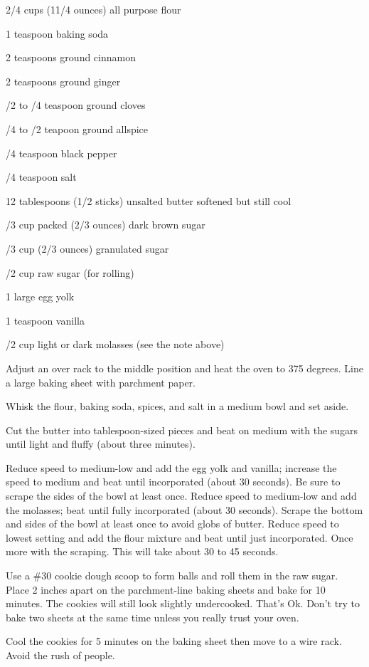 \begin{IngredientsAndSteps}
    \ListIngredientsAndSteps
    {
        2/4 cups (11/4 ounces) all purpose flour

        1 teaspoon baking soda

        2 teaspoons ground cinnamon

        2 teaspoons ground ginger

        /2 to /4 teaspoon ground cloves

        /4 to /2 teapoon ground allspice

        /4 teaspoon black pepper

        /4 teaspoon salt

        \IngredientsSeparatorClear

        12 tablespoons (1/2 sticks) unsalted butter softened but still cool

        /3 cup packed (2/3 ounces) dark brown sugar

        /3 cup (2/3 ounces) granulated sugar

        /2 cup raw sugar (for rolling)

        1 large egg yolk

        1 teaspoon vanilla

        /2 cup light or dark molasses (see the note above)

    }
    {
        Adjust an over rack to the middle position and heat the oven to 375 degrees. Line a large baking sheet
        with parchment paper.

        Whisk the flour, baking soda, spices, and salt in a medium bowl and set aside.

        Cut the butter into tablespoon-sized pieces and beat on medium with the sugars until light and fluffy
        (about three minutes).

        Reduce speed to medium-low and add the egg yolk and vanilla; increase the speed to medium and beat
        until incorporated (about 30 seconds). Be sure to scrape the sides of the bowl at least once. Reduce
        speed to medium-low and add the molasses; beat until fully incorporated (about 30 seconds). Scrape the
        bottom and sides of the bowl at least once to avoid globs of butter. Reduce speed to lowest setting
        and add the flour mixture and beat until just incorporated. Once more with the scraping. This will
        take about 30 to 45 seconds.

        Use a \#30 cookie dough scoop to form balls and roll them in the raw sugar.
        Place 2 inches apart on the parchment-line baking sheets and bake for 10 minutes. The cookies will
        still look slightly undercooked. That's Ok. Don't try to bake two sheets at the same time unless
        you really trust your oven.

        Cool the cookies for 5 minutes on the baking sheet then move to a wire rack. Avoid the rush of people.
    }
\end{IngredientsAndSteps}

